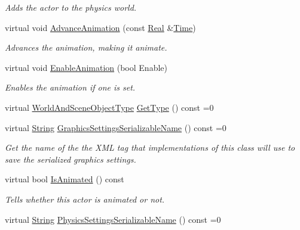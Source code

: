\begin{DoxyCompactItemize}
\begin{DoxyCompactList}\small\item\em Adds the actor to the physics world. \item\end{DoxyCompactList}\item 
virtual void \hyperlink{classMezzanine_1_1ActorBase_ab245d50e649ec7335bbfcba86d9dc889}{AdvanceAnimation} (const \hyperlink{namespaceMezzanine_a726731b1a7df72bf3583e4a97282c6f6}{Real} \&\hyperlink{structMezzanine_1_1Time}{Time})
\begin{DoxyCompactList}\small\item\em Advances the animation, making it animate. \item\end{DoxyCompactList}\item 
virtual void \hyperlink{classMezzanine_1_1ActorBase_a28c9397e90ec680faf61845525312864}{EnableAnimation} (bool Enable)
\begin{DoxyCompactList}\small\item\em Enables the animation if one is set. \item\end{DoxyCompactList}\item 
virtual \hyperlink{namespaceMezzanine_ae8cd04f706f4998be62f454b7119c718}{WorldAndSceneObjectType} \hyperlink{classMezzanine_1_1ActorBase_a83f7356d743f1b59ea58aac6d7570901}{GetType} () const =0
\item 
virtual \hyperlink{namespaceMezzanine_acf9fcc130e6ebf08e3d8491aebcf1c86}{String} \hyperlink{classMezzanine_1_1ActorBase_a636a0dbf78907d565d4cabd994442637}{GraphicsSettingsSerializableName} () const =0
\begin{DoxyCompactList}\small\item\em Get the name of the the XML tag that implementations of this class will use to save the serialized graphics settings. \item\end{DoxyCompactList}\item 
virtual bool \hyperlink{classMezzanine_1_1ActorBase_ade1c3e7a2e24df64a79d2acb8d6fc084}{IsAnimated} () const 
\begin{DoxyCompactList}\small\item\em Tells whether this actor is animated or not. \item\end{DoxyCompactList}\item 
virtual \hyperlink{namespaceMezzanine_acf9fcc130e6ebf08e3d8491aebcf1c86}{String} \hyperlink{classMezzanine_1_1ActorBase_a7a18ac81a996e2d68057223ebbc7959c}{PhysicsSettingsSerializableName} () const =0

\end{DoxyCompactItemize}
